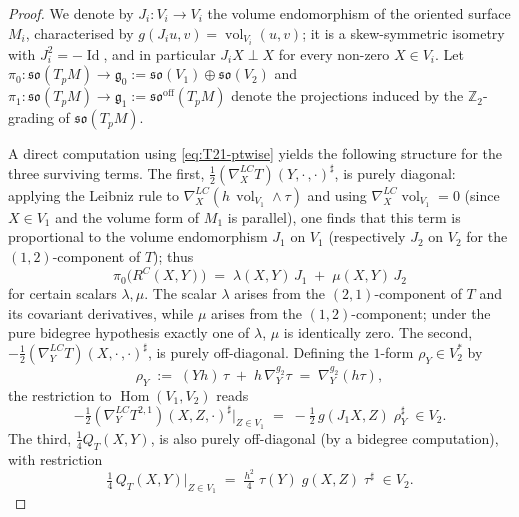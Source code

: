 \documentclass[11pt,reqno]{amsart}
\theoremstyle{plain}
\theoremstyle{definition}
\numberwithin{equation}{section}
\begin{document}
\begin{proof}
We denote by
$J_i\colon V_i\to V_i$ the volume endomorphism of
the oriented surface $M_i$, characterised by
$g(J_iu,v)=\operatorname{vol}_{V_i}(u,v)$;
it is a skew-symmetric isometry with
$J_i^2=-\operatorname{Id}$, and in particular
$J_iX\perp X$ for every non-zero $X\in V_i$.
Let
$\pi_0\colon\mathfrak{so}(T_pM)
\to\mathfrak{g}_0
:=\mathfrak{so}(V_1)\oplus\mathfrak{so}(V_2)$
and
$\pi_1\colon\mathfrak{so}(T_pM)
\to\mathfrak{g}_1
:=\mathfrak{so}^{\mathrm{off}}(T_pM)$
denote the projections induced by the
$\mathbb{Z}_2$-grading of $\mathfrak{so}(T_pM)$.

A direct computation
using \eqref{eq:T21-ptwise}
yields the following structure for the three
surviving terms.
The first,
$\frac{1}{2}(\nabla^{LC}_X T)(Y,\cdot\,,\cdot)^{\sharp}$,
is purely diagonal: applying the Leibniz rule to
$\nabla^{LC}_X(h\,\operatorname{vol}_{V_1}\wedge\tau)$
and using
$\nabla^{LC}_X\operatorname{vol}_{V_1}=0$
(since $X\in V_1$ and the volume form of $M_1$ is
parallel), one finds that this term is proportional
to the volume endomorphism $J_1$ on $V_1$
(respectively $J_2$ on $V_2$ for the
$(1,2)$-component of $T$); thus
\begin{equation}\label{eq:diag-comp}
  \pi_0\bigl(R^C(X,Y)\bigr)
  \;=\;
  \lambda(X,Y)\,J_1 \;+\; \mu(X,Y)\,J_2
\end{equation}
for certain scalars $\lambda,\mu$. The scalar $\lambda$ arises from the $(2,1)$-component of $T$ and its covariant derivatives, while $\mu$ arises from the $(1,2)$-component; under the pure bidegree hypothesis exactly one of $\lambda$, $\mu$ is identically zero.
The second,
$-\frac{1}{2}(\nabla^{LC}_YT)(X,\cdot\,,\cdot)^{\sharp}$,
is purely off-diagonal.
Defining the $1$-form
$\rho_Y\in V_2^*$ by
\begin{equation}\label{eq:rho-def}
  \rho_Y
  \;:=\;
  (Yh)\,\tau
  \;+\;
  h\,\nabla^{g_2}_Y\!\tau
  \;=\;
  \nabla^{g_2}_Y(h\tau),
\end{equation}
the restriction to
$\operatorname{Hom}(V_1,V_2)$ reads
\begin{equation}\label{eq:B-term}
  -\tfrac{1}{2}
  (\nabla^{LC}_YT^{2,1})(X,Z,\cdot)^{\sharp}
  \Big|_{Z\in V_1}
  \;=\;
  -\tfrac{1}{2}\,
  g(J_1X,Z)\;\rho_Y^{\sharp}
  \;\in V_2.
\end{equation}
The third, $\frac{1}{4}Q_T(X,Y)$, is also
purely off-diagonal (by a bidegree computation),
with restriction
\begin{equation}\label{eq:Q-term}
  \tfrac{1}{4}\,Q_T(X,Y)\big|_{Z\in V_1}
  \;=\;
  \tfrac{h^2}{4}\;\tau(Y)\;
  g(X,Z)\;\tau^{\sharp}
  \;\in V_2.
\end{equation}


\end{proof}
\end{document}
